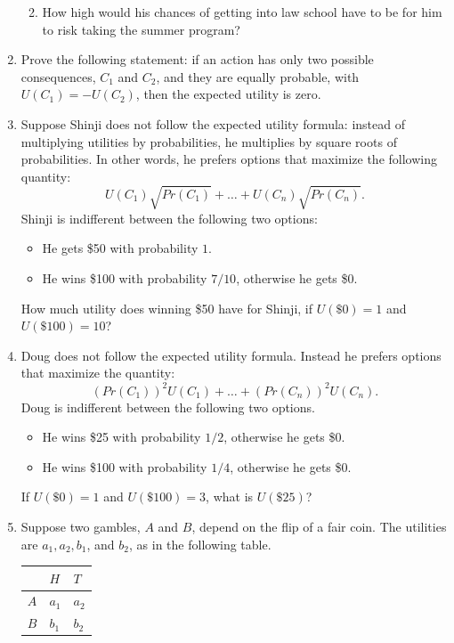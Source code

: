 \documentclass[justified]{tufte-book}
\providecommand{\tightlist}{%
  \setlength{\itemsep}{0pt}\setlength{\parskip}{0pt}}
\renewcommand{\u}{U}
\newcommand{\p}{Pr}
\theoremstyle{definition}
\theoremstyle{definition}
\theoremstyle{definition}
\theoremstyle{definition}
\theoremstyle{remark}
\begin{document}
\begin{enumerate}
  \begin{enumerate}
  \def\labelenumii{\alph{enumii}.}
  \setcounter{enumii}{2}
  \tightlist
  \item
    How high would his chances of getting into law school have to be for him to risk taking the summer program?
  \end{enumerate}
\item
  Prove the following statement: if an action has only two possible consequences, \(C_1\) and \(C_2\), and they are equally probable, with \(\u(C_1) = -\u(C_2)\), then the expected utility is zero.
\item
  Suppose Shinji does not follow the expected utility formula: instead of multiplying utilities by probabilities, he multiplies by square roots of probabilities. In other words, he prefers options that maximize the following quantity:
  \[ \u(C_1) \sqrt{\p(C_1)} + \ldots + \u(C_n) \sqrt{\p(C_n)}. \]
  Shinji is indifferent between the following two options:

  \begin{itemize}
  \tightlist
  \item
    He gets \$50 with probability \(1\).
  \item
    He wins \$100 with probability \(7/10\), otherwise he gets \$0.
  \end{itemize}

  How much utility does winning \$50 have for Shinji, if \(\u(\$0) = 1\) and \(\u(\$100) = 10\)?
\item
  Doug does not follow the expected utility formula. Instead he prefers options that maximize the quantity:
  \[ (\p(C_1))^2 \u(C_1) + \ldots + (\p(C_n))^2 \u(C_n). \]
  Doug is indifferent between the following two options.

  \begin{itemize}
  \tightlist
  \item
    He wins \$25 with probability \(1/2\), otherwise he gets \$0.
  \item
    He wins \$100 with probability \(1/4\), otherwise he gets \$0.
  \end{itemize}

  If \(\u(\$0) = 1\) and \(\u(\$100) = 3\), what is \(\u(\$25)\)?
\item
  Suppose two gambles, \(A\) and \(B\), depend on the flip of a fair coin. The utilities are \(a_1, a_2, b_1\), and \(b_2\), as in the following table.

  \begin{longtable}[]{@{}lll@{}}
  \toprule
  & \(H\) & \(T\) \\
  \midrule
  \endhead
  \(A\) & \(a_1\) & \(a_2\) \\
  \(B\) & \(b_1\) & \(b_2\) \\
  \bottomrule
  \end{longtable}


\end{enumerate}
\end{document}
